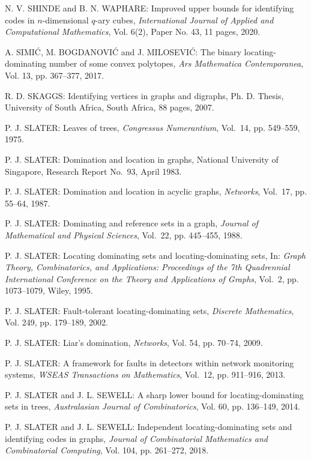 \begin{thebibliography}{999}
N. V. SHINDE and B. N. WAPHARE: Improved upper bounds for identifying codes in $n$-dimensional $q$-ary cubes, {\it International Journal of Applied and Computational Mathematics}, Vol. 6(2), Paper No. 43, 11 pages, 2020.

A. SIMI\'C, M. BOGDANOVI\'C and J. MILOSEVI\'C: The binary locating-dominating number of some convex polytopes, {\it Ars Mathematica Contemporanea}, Vol. 13, pp. 367--377, 2017.

R. D. SKAGGS: Identifying vertices in graphs and digraphs, Ph. D. Thesis, University of South Africa, South Africa, 88 pages, 2007.

P. J. SLATER: Leaves of trees, {\it Congressus Numerantium}, Vol.~14, pp. 549--559, 1975.

P. J. SLATER: Domination and location in graphs, National University of Singapore, Research Report No.~93, April 1983.

P. J. SLATER: Domination and location in acyclic graphs, {\it Networks}, Vol.~17, pp. 55--64, 1987.

P. J. SLATER: Dominating and reference sets in a graph, {\it Journal of Mathematical and Physical Sciences}, Vol.~22, pp. 445--455, 1988.

P. J. SLATER: Locating dominating sets and locating-dominating sets, In: {\it Graph Theory, Combinatorics, and Applications: Proceedings of the 7th Quadrennial International Conference on the Theory and Applications of Graphs}, Vol.~2, pp. 1073--1079, Wiley, 1995.

P. J. SLATER: Fault-tolerant locating-dominating sets, {\it Discrete Mathematics}, Vol. 249, pp. 179--189, 2002.

P. J. SLATER: Liar's domination, {\it Networks}, Vol. 54, pp. 70--74, 2009.

P. J. SLATER: A framework for faults in detectors within network monitoring systems, {\it WSEAS Transactions on Mathematics}, Vol.~12, pp. 911--916, 2013.

P. J. SLATER and J. L. SEWELL: A sharp lower bound for locating-dominating sets in trees, {\it Australasian Journal of Combinatorics}, Vol. 60, pp. 136--149, 2014.

P. J. SLATER and J. L. SEWELL: Independent locating-dominating sets and identifying codes in graphs, {\it Journal of Combinatorial Mathematics and Combinatorial Computing}, Vol. 104, pp. 261--272, 2018.


\end{thebibliography}
